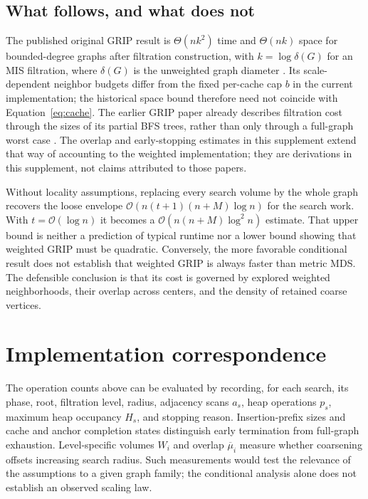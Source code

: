 \documentclass[11pt,a4paper]{article}
\newcommand{\bigO}{\mathcal O}
\begin{document}
\subsection{What follows, and what does not}

The published original GRIP result is $\Theta(nk^2)$ time and $\Theta(nk)$
space for bounded-degree graphs after filtration construction, with
$k=\log\delta(G)$ for an MIS filtration, where $\delta(G)$ is the unweighted
graph diameter \citep{gajer2004}. Its scale-dependent neighbor budgets differ
from the fixed per-cache cap $b$ in the current implementation; the historical
space bound therefore need not coincide with Equation~\eqref{eq:cache}.
The earlier GRIP
paper already describes filtration cost through the sizes of its partial BFS
trees, rather than only through a full-graph worst case \citep{gajer2002}.
The overlap and early-stopping estimates in this supplement extend that way of
accounting to the weighted implementation; they are derivations in this supplement, not
claims attributed to those papers.

Without locality assumptions, replacing every search volume by the whole graph
recovers the loose envelope
$\bigO(n(t+1)(n+M)\log n)$ for the search work. With $t=\bigO(\log n)$ it becomes
a $\bigO(n(n+M)\log^2 n)$ estimate. That upper bound is neither a
prediction of typical runtime nor a lower bound showing that weighted GRIP
must be quadratic. Conversely, the more favorable conditional result does not
establish that weighted GRIP is always faster than metric MDS. The defensible
conclusion is that its cost is governed by explored weighted neighborhoods,
their overlap across centers, and the density of retained coarse vertices.

\clearpage
\section{Implementation correspondence}

The operation counts above can be evaluated by recording, for each search,
its phase, root, filtration level, radius, adjacency scans $a_s$, heap
operations $p_s$, maximum heap occupancy $H_s$, and stopping reason.
Insertion-prefix sizes and cache and anchor completion states distinguish
early termination from full-graph exhaustion. Level-specific volumes $W_i$
and overlap $\overline\mu_i$ measure whether coarsening offsets increasing
search radius. Such measurements would test the relevance of the assumptions
to a given graph family; the conditional analysis alone does not establish
an observed scaling law.
\end{document}
